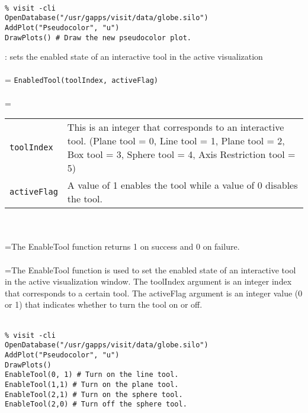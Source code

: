 \documentclass[10pt,a4paper]{report}
\begin{document}
\\[-6mm]
\begin{verbatim}% visit -cli
OpenDatabase("/usr/gapps/visit/data/globe.silo")
AddPlot("Pseudocolor", "u")
DrawPlots() # Draw the new pseudocolor plot.
\end{verbatim}
\newpage


{}
: sets the enabled state of an interactive tool in the active visualization\\[-3mm]

 \\ 
\hangindent=\parindent 
\verb!EnabledTool(toolIndex, activeFlag)!\\ [-3mm]

 \\ 
\hangindent=\parindent 
\begin{tabular}{lp{9cm}}
\verb!toolIndex! & This is an integer that corresponds to an interactive tool. (Plane tool = 0, Line tool = 1, Plane tool = 2, Box tool = 3,  Sphere tool = 4, Axis Restriction tool = 5) \\
\verb!activeFlag! & A value of 1 enables the tool while a value of 0 disables the tool. \\
\end{tabular} \\[-2mm]


 \\ 
\hangindent=\parindent The EnableTool function returns 1 on success and 0 on failure. \\[-3mm] 

 \\ 
\hangindent=\parindent The EnableTool function is used to set the enabled state of an interactive tool in the active visualization window. The toolIndex argument is an integer index that corresponds to a certain tool. The activeFlag argument is an integer value (0 or 1) that indicates whether to turn the tool on or off. \\[-3mm] 

\\[-6mm]
\begin{verbatim}% visit -cli
OpenDatabase("/usr/gapps/visit/data/globe.silo")
AddPlot("Pseudocolor", "u")
DrawPlots()
EnableTool(0, 1) # Turn on the line tool.
EnableTool(1,1) # Turn on the plane tool.
EnableTool(2,1) # Turn on the sphere tool.
EnableTool(2,0) # Turn off the sphere tool.
\end{verbatim}
\newpage
\end{document}
